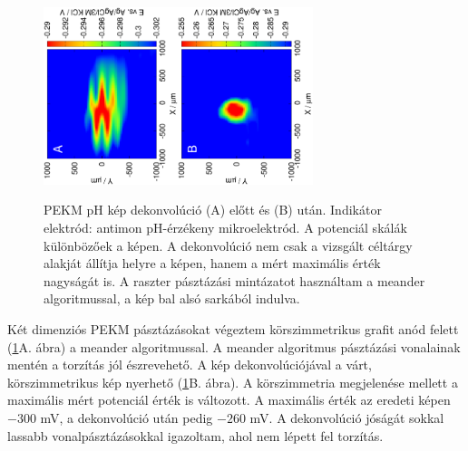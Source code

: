 \begin{figure}
\centering
\includegraphics[trim = 10mm 30mm 0mm 10mm, clip, width=0.35\textwidth, angle=-90]{img/pH_2D_Sb/13121313.eps}\includegraphics[trim = 10mm 30mm 0mm 10mm, clip, width=0.35\textwidth, angle=-90]{img/pH_2D_Sb/13121313_deconvoluted.eps}%
\caption{PEKM pH kép dekonvolúció (A) előtt és (B) után.
Indikátor elektród: antimon pH-érzékeny mikroelektród.
A potenciál skálák különbözőek a képen.
A dekonvolúció nem csak a vizsgált céltárgy alakját állítja helyre a képen, hanem a mért maximális érték nagyságát is.
A raszter pásztázási mintázatot használtam a meander algoritmussal, a kép bal alsó sarkából indulva.}
\label{fig:deconvolution}
\end{figure}

Két dimenziós PEKM pásztázásokat végeztem körszimmetrikus grafit anód felett (\ref{fig:deconvolution}A. ábra) a meander algoritmussal.
A meander algoritmus pásztázási vonalainak mentén a torzítás jól észrevehető.
A kép dekonvolúciójával a várt, körszimmetrikus kép nyerhető (\ref{fig:deconvolution}B. ábra).
A körszimmetria megjelenése mellett a maximális mért potenciál érték is változott.
A maximális érték az eredeti képen $-300$ mV, a dekonvolúció után pedig $-260$ mV.
A dekonvolúció jóságát sokkal lassabb vonalpásztázásokkal igazoltam, ahol nem lépett fel torzítás.

